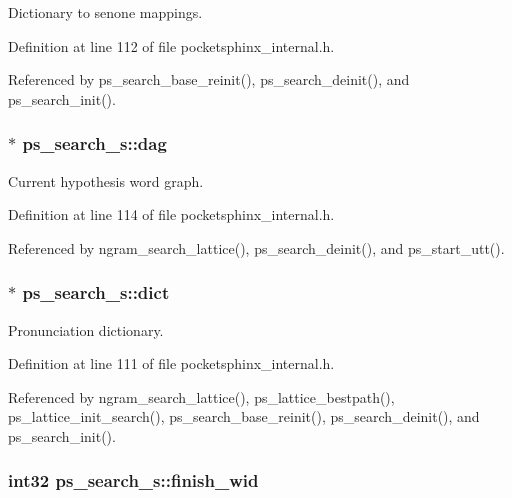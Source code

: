 Dictionary to senone mappings. 



Definition at line 112 of file pocketsphinx\-\_\-internal.\-h.



Referenced by ps\-\_\-search\-\_\-base\-\_\-reinit(), ps\-\_\-search\-\_\-deinit(), and ps\-\_\-search\-\_\-init().

\subsubsection[{dag}]{$\ast$ ps\-\_\-search\-\_\-s\-::dag}\label{structps__search__s_a897f46c55d17e817ff1364f555b31463}


Current hypothesis word graph. 



Definition at line 114 of file pocketsphinx\-\_\-internal.\-h.



Referenced by ngram\-\_\-search\-\_\-lattice(), ps\-\_\-search\-\_\-deinit(), and ps\-\_\-start\-\_\-utt().

\subsubsection[{dict}]{$\ast$ ps\-\_\-search\-\_\-s\-::dict}\label{structps__search__s_a918f243fa966e72c47f697fb9e60089d}


Pronunciation dictionary. 



Definition at line 111 of file pocketsphinx\-\_\-internal.\-h.



Referenced by ngram\-\_\-search\-\_\-lattice(), ps\-\_\-lattice\-\_\-bestpath(), ps\-\_\-lattice\-\_\-init\-\_\-search(), ps\-\_\-search\-\_\-base\-\_\-reinit(), ps\-\_\-search\-\_\-deinit(), and ps\-\_\-search\-\_\-init().

\subsubsection[{finish\-\_\-wid}]{\setlength{\rightskip}{0pt plus 5cm}int32 ps\-\_\-search\-\_\-s\-::finish\-\_\-wid}\label{structps__search__s_a0fb4d79f1084bdbbc0a808513f7c1ca7}


